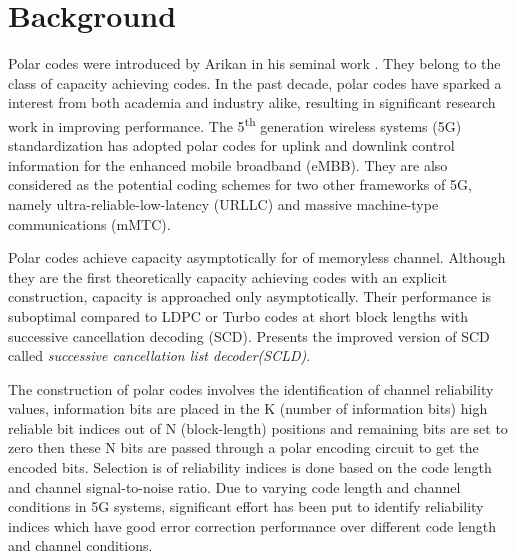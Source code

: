 \chapter{Background} \label{chap:Background}

\setcounter{secnumdepth}{3}
\renewcommand{\thesubsubsection}{\Alph{subsubsection}}



Polar codes were introduced by Arikan in his seminal work \cite{Arikan}. They belong to the class of capacity achieving codes. In the past decade, polar codes have sparked a interest from both academia and industry alike, resulting in significant research work in improving performance. The 5\textsuperscript{th} generation wireless systems (5G) standardization has adopted polar codes for uplink and downlink control information for the enhanced mobile broadband (eMBB). They are also considered as the potential coding schemes for two other frameworks of 5G, namely ultra-reliable-low-latency (URLLC) and massive machine-type communications (mMTC).

Polar codes achieve capacity asymptotically for of memoryless channel. Although they are the first theoretically capacity achieving codes with an explicit construction, capacity is approached only asymptotically. Their performance is suboptimal compared to LDPC or Turbo codes at short block lengths with successive cancellation decoding (SCD). \cite{SCL} Presents the improved version of SCD called \emph{successive cancellation list decoder(SCLD)}.

The construction of polar codes involves the identification of channel reliability values, information bits are placed in the K (number of information bits) high reliable bit indices out of N (block-length) positions and remaining bits are set to zero then these N bits are passed through a polar encoding circuit to get the encoded bits. Selection is of reliability indices is done based on the code length and channel signal-to-noise ratio. Due to varying code length and channel conditions in 5G systems, significant effort has been put to identify reliability indices which have good error correction performance over different code length and channel conditions.

